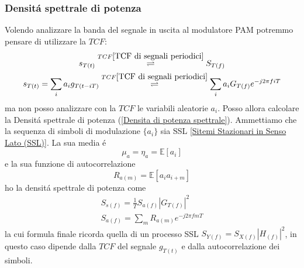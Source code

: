         \subsubsection{Densitá spettrale di potenza}\label{Densita spettrale di potenza - PAM}
            Volendo analizzare la banda del segnale in uscita al modulatore PAM potremmo pensare di utilizzare la $TCF$:
            \begin{gather}
                s_{T(t)} \overset{TCF\ref{TCF di segnali periodici}}{\rightleftharpoons} S_{T(f)}\nonumber\\
                s_{T(t)}  = \sum_{i}a_i g_{T(t-iT)} \overset{TCF\ref{TCF di segnali periodici}}{\rightleftharpoons} \sum_{i}a_i G_{T(f)} e^{-j2\pi fiT}  \nonumber
            \end{gather}
            ma non posso analizzare con la $TCF$ le variabili aleatorie $a_i$. Posso allora calcolare la Densitá spettrale di potenza (\ref{Densita di potenza spettrale}).
            Ammettiamo che la sequenza di simboli di modulazione $\{a_i\}$ sia SSL \ref{Sitemi Stazionari in Senso Lato (SSL)}. La sua media é
            \[
                \mu_a = \eta_a = \mathbb{E}[a_i]
            \]  
            e la sua funzione di autocorrelazione
            \[
                R_{a(m)} = \mathbb{E}[a_ia_{i+m}]    
            \]
            ho la densitá spettrale di potenza come 
            \begin{gather}
                S_{s(f)} = \frac{1}{T} S_{a(f)}\left|G_{T(f)}\right|^2 \nonumber \\
                S_{a(f)} = \sum_{m} R_{a(m)}e^{-j2\pi fmT} \nonumber
            \end{gather}
            la cui formula finale ricorda quella di un processo SSL $S_{Y(f)} = S_{X(f)}\left|H_{(f)}\right|^2$, in questo
            caso dipende dalla $TCF$ del segnale $g_{T(t)}$ e dalla autocorrelazione dei simboli.

